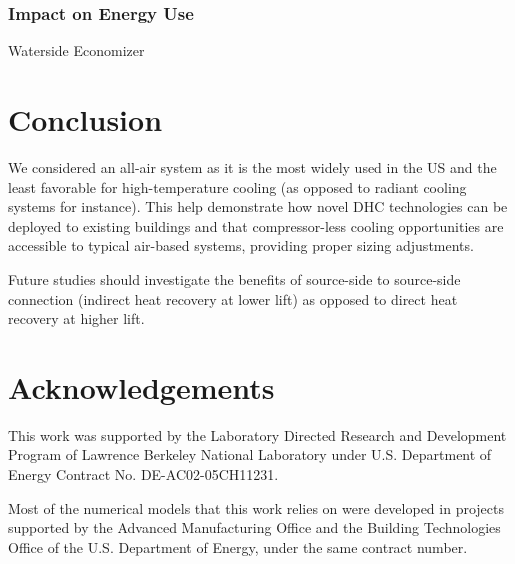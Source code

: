 \subsubsection{Impact on Energy Use} \label{sec:energy}

Waterside Economizer







\section{Conclusion} \label{sec:concl}

We considered an all-air system as it is the most widely used in the US and the least favorable for high-temperature cooling (as opposed to radiant cooling systems for instance).
This help demonstrate how novel DHC technologies can be deployed to existing buildings and that compressor-less cooling opportunities are accessible to typical air-based systems, providing proper sizing adjustments.

Future studies should investigate the benefits of source-side to source-side connection (indirect heat recovery at lower lift) as opposed to direct heat recovery at higher lift.


\section{Acknowledgements} \label{sec:acknowledge}

This work was supported by the Laboratory Directed Research and Development Program of Lawrence Berkeley National Laboratory under U.S. Department of Energy Contract No. DE-AC02-05CH11231.

Most of the numerical models that this work relies on were developed in projects supported by the Advanced Manufacturing Office and the Building Technologies Office of the U.S. Department of Energy, under the same contract number.


